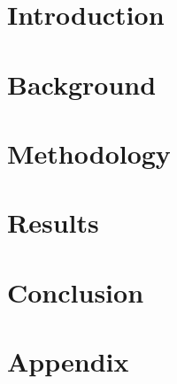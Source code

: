 \documentclass[utf8]{article}
\begin{document}
\section{Introduction}\label{sec:intro}

%


\section{Background}\label{sec:background}


\section{Methodology}\label{sec:methodology}

\section{Results}\label{sec:results}




\section{Conclusion}\label{sec:discussion}

%
%

\printbibliography

\appendix
\newpage
\FloatBarrier


%
%
%
%
\section{Appendix}\label{sec:app}
%
%
%
%
%
\end{document}
